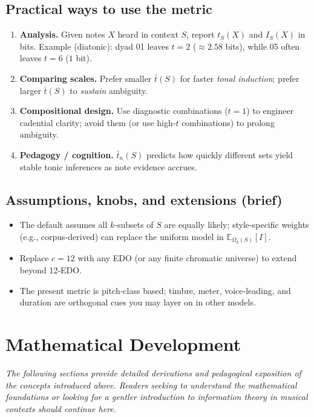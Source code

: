 \documentclass[10pt,twocolumn]{article}
\numberwithin{equation}{section} %
\begin{document}
    \subsection*{Practical ways to use the metric}
    \begin{enumerate}
        \item \textbf{Analysis.} Given notes $X$ heard in context $S$, report $t_S(X)$ and $I_S(X)$ in bits. Example (diatonic): dyad 01 leaves $t{=}2$ ($\approx 2.58$ bits), while 05 often leaves $t{=}6$ ($1$ bit).
        \item \textbf{Comparing scales.} Prefer smaller $\bar{t}(S)$ for faster \emph{tonal induction}; prefer larger $\bar{t}(S)$ to \emph{sustain} ambiguity.
        \item \textbf{Compositional design.} Use diagnostic combinations ($t{=}1$) to engineer cadential clarity; avoid them (or use high‑$t$ combinations) to prolong ambiguity.
        \item \textbf{Pedagogy / cognition.} $\bar{t}_n(S)$ predicts how quickly different sets yield stable tonic inferences as note evidence accrues.
    \end{enumerate}

    \subsection*{Assumptions, knobs, and extensions (brief)}
    \begin{itemize}
        \item The default assumes all $k$‑subsets of $S$ are equally likely; style‑specific weights (e.g., corpus‑derived) can replace the uniform model in $\mathbb{E}_{\Omega_k(S)}[I]$.
        \item Replace $c{=}12$ with any EDO (or any finite chromatic universe) to extend beyond 12‑EDO.
        \item The present metric is pitch‑class based; timbre, meter, voice‑leading, and duration are orthogonal cues you may layer on in other models.
    \end{itemize}



    \section{Mathematical Development}\label{sec:math-dev}

    \textit{The following sections provide detailed derivations and pedagogical exposition of the concepts introduced above.
Readers seeking to understand the mathematical foundations or looking for a gentler introduction to information theory in musical contexts should continue here.}
\end{document}
